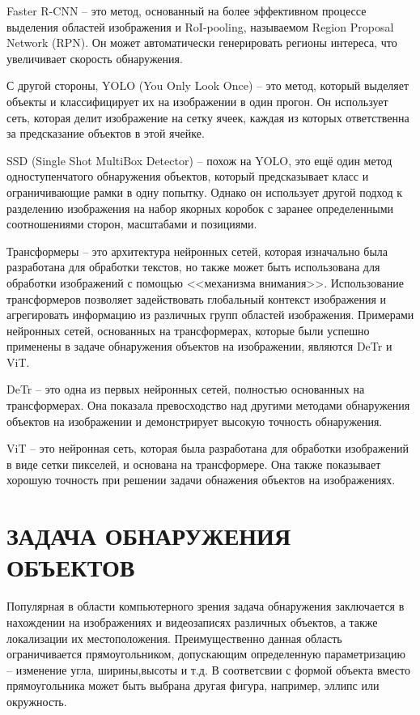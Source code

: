 \documentclass[14pt,a4paper]{extarticle}
\begin{document}
Faster R-CNN \cite{F2RCNN} -- это метод, основанный на более эффективном процессе выделения областей изображения и RoI-pooling, называемом Region Proposal Network (RPN). Он может автоматически генерировать регионы интереса, что увеличивает скорость обнаружения.

С другой стороны, YOLO (You Only Look Once) \cite{YOLO_art} -- это метод, который выделяет объекты и классифицирует их на изображении в один прогон. Он использует сеть, которая делит изображение на сетку ячеек, каждая из которых ответственна за предсказание объектов в этой ячейке.

SSD (Single Shot MultiBox Detector) \cite{SSD_art} -- похож на YOLO, это ещё один метод одноступенчатого обнаружения объектов, который предсказывает класс и ограничивающие рамки в одну попытку. Однако он использует другой подход к разделению изображения на набор якорных коробок с заранее определенными соотношениями сторон, масштабами и позициями.

Трансформеры \cite{Trans} -- это архитектура нейронных сетей, которая изначально была разработана для обработки текстов, но также может быть использована для обработки изображений с помощью <<механизма внимания>>. Использование трансформеров позволяет задействовать глобальный контекст изображения и агрегировать информацию из различных групп областей изображения. Примерами нейронных сетей, основанных на трансформерах, которые были успешно применены в задаче обнаружения объектов на изображении, являются DeTr и ViT.

DeTr \cite{DeTr} -- это одна из первых нейронных сетей, полностью основанных на трансформерах. Она показала превосходство над другими методами обнаружения объектов на изображении и демонстрирует высокую точность обнаружения. 

ViT \cite{ViT}-- это нейронная сеть, которая была разработана для обработки изображений в виде сетки пикселей, и основана на трансформере. Она также показывает хорошую точность при решении задачи обнажения объектов на изображениях.

\newpage
\section{ЗАДАЧА ОБНАРУЖЕНИЯ ОБЪЕКТОВ}
Популярная в области компьютерного зрения задача обнаружения заключается в нахождении на изображениях и видеозаписях различных объектов, а также локализации их местоположения. Преимущественно данная область ограничивается прямоугольником, допускающим определенную параметризацию -- изменение угла, ширины,высоты и т.д. В соответсвии с формой объекта вместо прямоугольника может быть выбрана другая фигура, например, эллипс или окружность.
\end{document}
